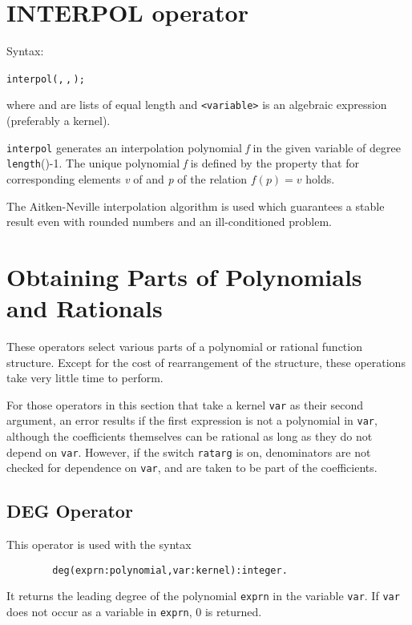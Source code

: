 \section{INTERPOL operator}
\hypertarget{operator:INTERPOL}{}

Syntax:
\begin{syntax}
  \texttt{interpol(}\texttt{,}\,\texttt{,}\,\texttt{);}
\end{syntax}

where  and  are lists of equal length and
\texttt{<variable>} is an algebraic expression (preferably a kernel).

\texttt{interpol} generates an interpolation polynomial \emph{f} in the given
variable of degree \texttt{length}()-1.  The unique polynomial 
\emph{f}
is defined by the property that for corresponding elements \emph{v} of
 and \emph{p} of  the relation $f(p)=v$ holds.

The Aitken-Neville interpolation algorithm is used which guarantees a
stable result even with rounded numbers and an ill-conditioned problem.

\section{Obtaining Parts of Polynomials and Rationals}

These operators select various parts of a polynomial or rational function
structure. Except for the cost of rearrangement of the structure, these
operations take very little time to perform.

For those operators in this section that take a kernel \texttt{var} as their
second argument, an error results if the first expression is not a
polynomial in \texttt{var}, although the coefficients themselves can be
rational as long as they do not depend on \texttt{var}.  However, if the
switch \texttt{ratarg} is on, denominators are not checked
for dependence on \texttt{var}, and are taken to be part of the coefficients.

\subsection{DEG Operator}
\hypertarget{operator:DEG}{}

This operator is used with the syntax
\begin{verbatim}
        deg(exprn:polynomial,var:kernel):integer.
\end{verbatim}
It returns the leading degree of the polynomial \texttt{exprn}
in the variable \texttt{var}.  If \texttt{var} does not occur as a variable in
\texttt{exprn}, 0 is returned.

